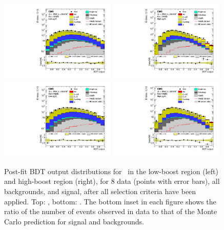 \documentclass[11pt,twoside,a4paper,cmspaper,final,collab]{cms-tdr}
\begin{document}
\begin{figure}[htbp]
\centering
    \includegraphics[width=0.49\textwidth]{BDT_Zll_ZmmLowPt_PostFit_s.pdf}
    \includegraphics[width=0.49\textwidth]{BDT_Zll_ZmmHighPt_PostFit_s.pdf}
   \includegraphics[width=0.49\textwidth]{BDT_Zll_ZeeLowPt_PostFit_s.pdf}
    \includegraphics[width=0.49\textwidth]{BDT_Zll_ZeeHighPt_PostFit_s.pdf}
    \caption{Post-fit BDT output distributions for \ZllH\ in the
    low-boost region (left) and high-boost region (right), for 8\TeV
    data (points with error bars),
    all backgrounds, and signal, after all selection criteria have been
    applied. Top: \ZmmH, bottom: \ZeeH. The bottom inset in each
      figure shows the ratio of the number of events observed in data to that
      of the Monte Carlo prediction for signal and backgrounds.}
    \label{fig:BDTZmm8TeV}
\end{figure}
\end{document}
